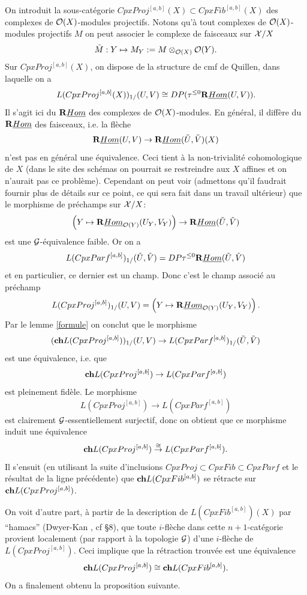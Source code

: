 \documentclass[12pt]{article}
\newcommand{\Gg}{{\cal G}}
\newcommand{\Oo}{{\cal O}}
\newcommand{\Xx}{{\cal X}}
\begin{document}
On introduit la sous-cat\'egorie $CpxProj^{[a,b]}(X)\subset CpxFib^{[a,b]}(X)$
des complexes de $\Oo (X)$-modules projectifs. Notons qu'\`a tout
complexes de $\Oo (X)$-modules
projectifs $M$ on peut associer le complexe de faisceaux sur $\Xx/X$
$$
\tilde{M}:Y\mapsto M_Y:= M\otimes _{\Oo
(X)}\Oo (Y).
$$
Sur $CpxProj^{[a,b]}(X)$, on dispose de la
structure de cmf de Quillen, dans laquelle on a
$$
L(CpxProj^{[a,b]}(X))_{1/}(U,V)
\cong DP(\tau ^{\leq 0} {\bf R} \underline{Hom} (U,V)).
$$
Il s'agit ici du ${\bf R} \underline{Hom}$ des complexes de
$\Oo (X)$-modules. En g\'en\'eral, il diff\`ere du
${\bf R} \underline{Hom}$ des faisceaux, i.e. la fl\`eche
$$
{\bf R} \underline{Hom} (U,V) \rightarrow {\bf R} \underline{Hom}
(\tilde{U},\tilde{V}) (X)
$$
n'est pas en g\'en\'eral une \'equivalence. Ceci tient \`a la non-trivialit\'e
cohomologique de $X$ (dans le site des sch\'emas on pourrait se restreindre
aux $X$ affines et on n'aurait pas ce probl\`eme). Cependant on peut voir
(admettons qu'il faudrait fournir plus de d\'etails sur ce point, ce qui sera
fait dans un travail ult\'erieur) que le morphisme de pr\'echamps sur $\Xx /X$:
$$
\left( Y\mapsto {\bf R} \underline{Hom} _{\Oo (Y)}(U_Y,V_Y)\right)
\rightarrow {\bf R} \underline{Hom}
(\tilde{U},\tilde{V})
$$
est une $\Gg$-\'equivalence faible. Or on a
$$
L(CpxParf^{[a,b]})_{1/}(\tilde{U}, \tilde{V})=
DP \tau ^{\leq 0}{\bf R} \underline{Hom}
(\tilde{U},\tilde{V})
$$
et en particulier, ce dernier est un champ. Donc c'est le champ associ\'e au
pr\'echamp
$$
L(CpxProj^{[a,b]})_{1/}(U,V) =
\left( Y\mapsto {\bf R} \underline{Hom} _{\Oo (Y)}(U_Y,V_Y)\right) .
$$
Par le lemme \ref{formule} on conclut que le morphisme
$$
({\bf ch}L(CpxProj^{[a,b]}))_{1/}(U,V) \rightarrow
L(CpxParf^{[a,b]})_{1/}(\tilde{U}, \tilde{V})
$$
est une \'equivalence, i.e. que
$$
{\bf ch}L(CpxProj^{[a,b]})\rightarrow L(CpxParf^{[a,b]})
$$
est pleinement fid\`ele. Le morphisme
$$
L(CpxProj^{[a,b]})\rightarrow L(CpxParf^{[a,b]})
$$
est clairement $\Gg$-essentiellement surjectif, donc on obtient que ce
morphisme induit une \'equivalence
$$
{\bf ch}L(CpxProj^{[a,b]})\stackrel{\cong}{\rightarrow} L(CpxParf^{[a,b]}).
$$
Il s'ensuit
(en utilisant la suite d'inclusions $CpxProj \subset CpxFib \subset CpxParf$
et le r\'esultat de la ligne pr\'ec\'edente) que ${\bf ch}L(CpxFib^{[a,b]})$
se r\'etracte sur  ${\bf ch}L(CpxProj^{[a,b]})$.

On voit d'autre part, \`a partir de la description de $L(CpxFib^{[a,b]})(X)$ par
``hamacs'' (Dwyer-Kan \cite{DwyerKan2}, cf \S 8), que toute $i$-fl\`eche dans
cette $n+1$-cat\'egorie provient localement (par rapport \`a la topologie
$\Gg$) d'une $i$-fl\`eche de $L(CpxProj^{[a,b]})$. Ceci implique que la
r\'etraction trouv\'ee est une \'equivalence
$$
{\bf ch}L(CpxProj^{[a,b]}) \cong {\bf ch}L(CpxFib^{[a,b]}).
$$
On a finalement obtenu la proposition suivante.
\end{document}
